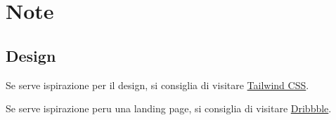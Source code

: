 \documentclass[12pt]{article}
\begin{document}
\pagebreak
\section{Note}
\subsection{Design}
Se serve ispirazione per il design, si consiglia di visitare
\href{https://www.tailwindcss.com}{Tailwind CSS}.

Se serve ispirazione peru una landing page, si consiglia di visitare
\href{https://dribbble.com}{Dribbble}.
\end{document}
